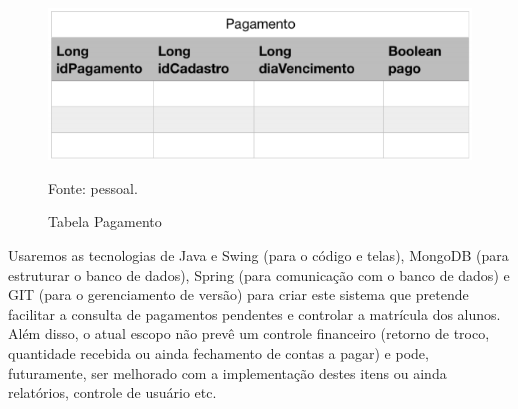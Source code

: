 \begin{figure}[H]
	\centering
	\includegraphics[width=0.7\linewidth]{images/tabelaPagamento}
	\caption{Tabela Pagamento}
	Fonte: pessoal.
	\label{fig:tabelaPagamento}
\end{figure}

Usaremos as tecnologias de Java e Swing (para o código e telas), MongoDB (para estruturar o banco de dados), Spring (para comunicação com o banco de dados) e GIT (para o gerenciamento de versão) para criar este sistema que pretende facilitar a consulta de pagamentos pendentes e controlar a matrícula dos alunos. Além disso, o atual escopo não prevê um controle financeiro (retorno de troco, quantidade recebida ou ainda fechamento de contas a pagar) e pode, futuramente, ser melhorado com a implementação destes itens ou ainda relatórios, controle de usuário etc.